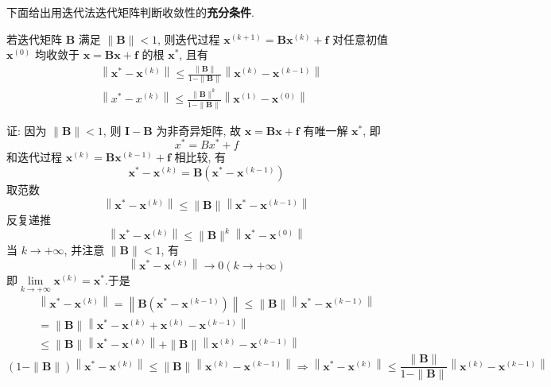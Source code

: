 下面给出用迭代法迭代矩阵判断收敛性的\textbf{充分条件}.

\begin{tcolorbox}[enhanced,colback=2,colframe=1,breakable,coltitle=black,title=定理]
 若迭代矩阵 $ \boldsymbol{B} $ 满足 $ \|\boldsymbol{B}\|<1 $, 则迭代过程 $ \boldsymbol{x}^{(k+1)}=\boldsymbol{B} \boldsymbol{x}^{(k)}+\boldsymbol{f} $ 对任意初值 $ \boldsymbol{x}^{(0)} $ 均收敛于 $ \boldsymbol{x}=\boldsymbol{B} \boldsymbol{x}+\boldsymbol{f} $ 的根 $ \boldsymbol{x}^{*} $, 且有
$$
\begin{aligned}
&\left\|\boldsymbol{x}^{*}-\boldsymbol{x}^{(k)}\right\| \leqslant \frac{\|\boldsymbol{B}\|}{1-\|\boldsymbol{B}\|}\left\|\boldsymbol{x}^{(k)}-\boldsymbol{x}^{(k-1)}\right\| \\
&\left\|x^{*}-x^{(k)}\right\| \leqslant \frac{\|\boldsymbol{B}\|^{k}}{1-\|\boldsymbol{B}\|}\left\|\boldsymbol{x}^{(1)}-\boldsymbol{x}^{(0)}\right\|
\end{aligned}
$$
\end{tcolorbox}
证: 因为 $ \|\boldsymbol{B}\|<1 $, 则 $ \boldsymbol{I}-\boldsymbol{B} $ 为非奇异矩阵, 故 $ \boldsymbol{x}=\boldsymbol{B} \boldsymbol{x}+\boldsymbol{f} $ 有唯一解 $ \boldsymbol{x}^{*} $, 即
$$
x^{*}=B x^{*}+f
$$
和迭代过程 $ \boldsymbol{x}^{(k)}=\boldsymbol{B} \boldsymbol{x}^{(k-1)}+\boldsymbol{f} $ 相比较, 有
$$
\boldsymbol{x}^{*}-\boldsymbol{x}^{(k)}=\boldsymbol{B}\left(\boldsymbol{x}^{*}-\boldsymbol{x}^{(k-1)}\right)
$$
取范数
$$
\left\|\boldsymbol{x}^{*}-\boldsymbol{x}^{(k)}\right\| \leqslant\|\boldsymbol{B}\|\left\|\boldsymbol{x}^{*}-\boldsymbol{x}^{(k-1)}\right\|
$$
反复递推
$$
\left\|\boldsymbol{x}^{*}-\boldsymbol{x}^{(k)}\right\| \leqslant\|\boldsymbol{B}\|^{k}\left\|\boldsymbol{x}^{*}-\boldsymbol{x}^{(0)}\right\|
$$
当 $ k \rightarrow+\infty $, 并注意 $ \|\boldsymbol{B}\|<1 $, 有
$$
\left\|\boldsymbol{x}^{*}-\boldsymbol{x}^{(k)}\right\| \rightarrow 0(k \rightarrow+\infty)
$$
即$\lim\limits _{k \rightarrow+\infty} \boldsymbol{x}^{(k)}=\boldsymbol{x}^{*}$.于是
$$
\begin{array}{l}
\left\|\boldsymbol{x}^{*}-\boldsymbol{x}^{(k)}\right\|=\left\|\boldsymbol{B}\left(\boldsymbol{x}^{*}-\boldsymbol{x}^{(k-1)}\right)\right\| \leqslant\|\boldsymbol{B}\|\left\|\boldsymbol{x}^{*}-\boldsymbol{x}^{(k-1)}\right\| \\
=\|\boldsymbol{B}\|\left\|\boldsymbol{x}^{*}-\boldsymbol{x}^{(k)}+\boldsymbol{x}^{(k)}-\boldsymbol{x}^{(k-1)}\right\| \\
\leqslant\|\boldsymbol{B}\|\left\|\boldsymbol{x}^{*}-\boldsymbol{x}^{(k)}\right\|+\|\boldsymbol{B}\|\left\|\boldsymbol{x}^{(k)}-\boldsymbol{x}^{(k-1)}\right\|
\end{array}
$$
$$(1-\|\boldsymbol{B}\|)\left\|\boldsymbol{x}^{*}-\boldsymbol{x}^{(k)}\right\| \leqslant\|\boldsymbol{B}\|\left\|\boldsymbol{x}^{(k)}-\boldsymbol{x}^{(k-1)}\right\| \Rightarrow
\left\|\boldsymbol{x}^{*}-\boldsymbol{x}^{(k)}\right\| \leqslant \frac{\|\boldsymbol{B}\|}{1-\|\boldsymbol{B}\|}\left\|\boldsymbol{x}^{(k)}-\boldsymbol{x}^{(k-1)}\right\|$$


